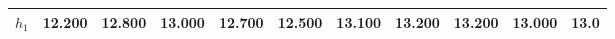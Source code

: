 
        \begin{tabular}{c|*{10}{c}}
            \hline
            \hline
                \(h_{1}\) & 12.200 & 12.800 & 13.000 & 12.700 & 12.500 & 13.100 & 13.200 & 13.200 & 13.000 & 13.0 \\
            \hline
            
            \hline
            \hline
        \end{tabular}
        